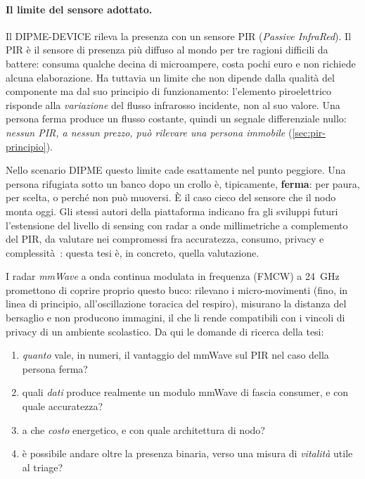 
\paragraph{Il limite del sensore adottato.}
Il DIPME-DEVICE rileva la presenza con un sensore PIR (\emph{Passive InfraRed}).
Il PIR è il sensore di presenza più diffuso al mondo per tre ragioni difficili
da battere: consuma qualche decina di microampere, costa pochi euro e non richiede
alcuna elaborazione. Ha tuttavia un limite che non dipende dalla qualità del
componente ma dal suo principio di funzionamento: l'elemento piroelettrico risponde
alla \emph{variazione} del flusso infrarosso incidente, non al suo valore. Una
persona ferma produce un flusso costante, quindi un segnale differenziale nullo:
\emph{nessun PIR, a nessun prezzo, può rilevare una persona immobile}
(\cref{sec:pir-principio}).

Nello scenario DIPME questo limite cade esattamente nel punto peggiore. Una
persona rifugiata sotto un banco dopo un crollo è, tipicamente, \textbf{ferma}:
per paura, per scelta, o perché non può muoversi. È il caso cieco del sensore
che il nodo monta oggi. Gli stessi autori della piattaforma indicano fra gli sviluppi
futuri l'estensione del livello di sensing con radar a onde millimetriche a
complemento del PIR, da valutare nei compromessi fra accuratezza, consumo, privacy e
complessità~\cite{callisto2026dipme}: questa tesi è, in concreto, quella valutazione.

I radar \emph{mmWave} a onda continua modulata in frequenza (FMCW) a 24~GHz
promettono di coprire proprio questo buco: rilevano i micro-movimenti
(fino, in linea di principio, all'oscillazione toracica del respiro), misurano la
distanza del bersaglio e non producono immagini, il che li rende compatibili con i
vincoli di privacy di un ambiente scolastico. Da qui le domande di ricerca della
tesi:

\begin{enumerate}[leftmargin=2em,itemsep=2pt]
  \item \emph{quanto} vale, in numeri, il vantaggio del mmWave sul PIR nel caso
        della persona ferma?
  \item quali \emph{dati} produce realmente un modulo mmWave di fascia consumer, e
        con quale accuratezza?
  \item a che \emph{costo} energetico, e con quale architettura di nodo?
  \item è possibile andare oltre la presenza binaria, verso una misura di
        \emph{vitalità} utile al triage?
\end{enumerate}

